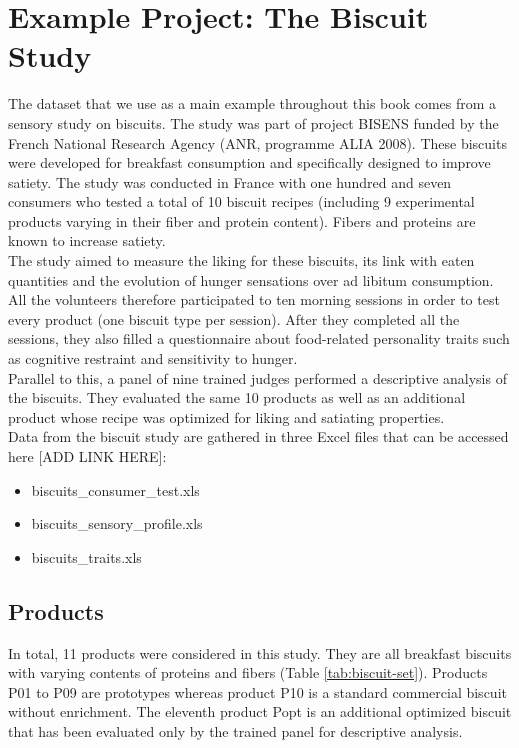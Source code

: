 \documentclass[
]{book}
\providecommand{\tightlist}{%
  \setlength{\itemsep}{0pt}\setlength{\parskip}{0pt}}
\begin{document}
\hypertarget{example-projects}{%
\chapter{Example Project: The Biscuit Study}\label{example-projects}}

The dataset that we use as a main example throughout this book comes from a sensory study on biscuits. The study was part of project BISENS funded by the French National Research Agency (ANR, programme ALIA 2008). These biscuits were developed for breakfast consumption and specifically designed to improve satiety.
The study was conducted in France with one hundred and seven consumers who tested a total of 10 biscuit recipes (including 9 experimental products varying in their fiber and protein content). Fibers and proteins are known to increase satiety.\\
The study aimed to measure the liking for these biscuits, its link with eaten quantities and the evolution of hunger sensations over ad libitum consumption. All the volunteers therefore participated to ten morning sessions in order to test every product (one biscuit type per session). After they completed all the sessions, they also filled a questionnaire about food-related personality traits such as cognitive restraint and sensitivity to hunger.\\
Parallel to this, a panel of nine trained judges performed a descriptive analysis of the biscuits. They evaluated the same 10 products as well as an additional product whose recipe was optimized for liking and satiating properties.\\
Data from the biscuit study are gathered in three Excel files that can be accessed here {[}ADD LINK HERE{]}:

\begin{itemize}
\tightlist
\item
  biscuits\_consumer\_test.xls\\
\item
  biscuits\_sensory\_profile.xls\\
\item
  biscuits\_traits.xls
\end{itemize}

\hypertarget{products}{%
\section{Products}\label{products}}

In total, 11 products were considered in this study. They are all breakfast biscuits with varying contents of proteins and fibers (Table \ref{tab:biscuit-set}). Products P01 to P09 are prototypes whereas product P10 is a standard commercial biscuit without enrichment. The eleventh product Popt is an additional optimized biscuit that has been evaluated only by the trained panel for descriptive analysis.
\end{document}
